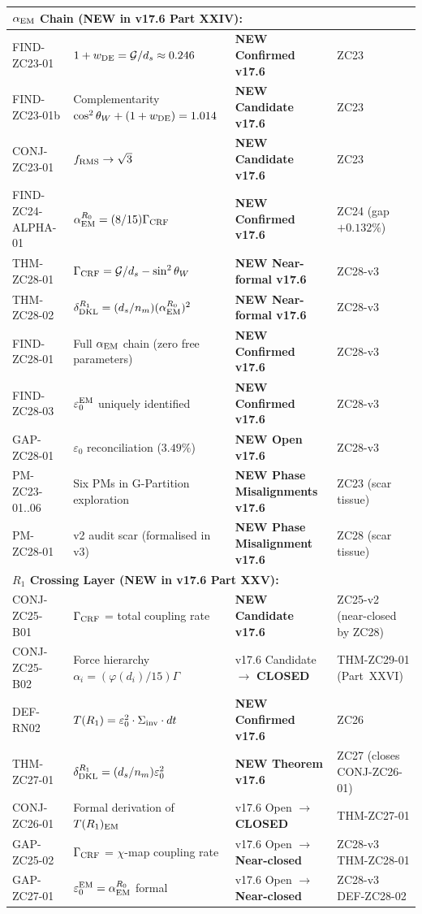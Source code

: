 \documentclass[12pt, a4paper]{article}
\begin{document}
\begin{keybox}[title={Master Z-Programme Status Table v17.6 (Canonical, Post-v17.6 Closures)}]
{\begin{longtable}{p{2.8cm} p{6.5cm} p{1.8cm} p{3.4cm}}
\midrule
\multicolumn{4}{l}{\textbf{$\alpha_{\rm EM}$ Chain (NEW in v17.6 Part XXIV):}} \\
\midrule
FIND-ZC23-01 & $1 + w_{\rm DE} = \mathcal{G}/d_s \approx 0.246$
   & \textbf{NEW Confirmed v17.6} & ZC23 \\
FIND-ZC23-01b & Complementarity $\cos^2\theta_W + (1+w_{\rm DE}) = 1.014$
   & \textbf{NEW Candidate v17.6} & ZC23 \\
CONJ-ZC23-01 & $f_{\rm RMS} \to \sqrt{3}$
   & \textbf{NEW Candidate v17.6} & ZC23 \\
FIND-ZC24-ALPHA-01 & $\alpha_{\rm EM}^{R_0} = (8/15)\Gamma_{\rm CRF}$
   & \textbf{NEW Confirmed v17.6} & ZC24 (gap $+0.132\%$) \\
THM-ZC28-01 & $\Gamma_{\rm CRF} = \mathcal{G}/d_s - \sin^2\theta_W$
   & \textbf{NEW Near-formal v17.6} & ZC28-v3 \\
THM-ZC28-02 & $\delta_{\rm DKL}^{R_1} = (d_s/n_m)(\alpha_{\rm EM}^{R_0})^2$
   & \textbf{NEW Near-formal v17.6} & ZC28-v3 \\
FIND-ZC28-01 & Full $\alpha_{\rm EM}$ chain (zero free parameters)
   & \textbf{NEW Confirmed v17.6} & ZC28-v3 \\
FIND-ZC28-03 & $\varepsilon_0^{\rm EM}$ uniquely identified
   & \textbf{NEW Confirmed v17.6} & ZC28-v3 \\
GAP-ZC28-01 & $\varepsilon_0$ reconciliation ($3.49\%$)
   & \textbf{NEW Open v17.6} & ZC28-v3 \\
PM-ZC23-01..06 & Six PMs in G-Partition exploration
   & \textbf{NEW Phase Misalignments v17.6} & ZC23 (scar tissue) \\
PM-ZC28-01 & v2 audit scar (formalised in v3)
   & \textbf{NEW Phase Misalignment v17.6} & ZC28 (scar tissue) \\

\midrule
\multicolumn{4}{l}{\textbf{$R_1$ Crossing Layer (NEW in v17.6 Part XXV):}} \\
\midrule
CONJ-ZC25-B01 & $\Gamma_{\rm CRF}$ = total coupling rate
   & \textbf{NEW Candidate v17.6} & ZC25-v2 (near-closed by ZC28) \\
CONJ-ZC25-B02 & Force hierarchy $\alpha_i = (\varphi(d_i)/15)\Gamma$
   & v17.6 Candidate $\to$ \textbf{CLOSED} & THM-ZC29-01 (Part~XXVI) \\
DEF-RN02 & $T(R_1) = \varepsilon_0^2 \cdot \Sigma_{\rm inv} \cdot dt$
   & \textbf{NEW Confirmed v17.6} & ZC26 \\
THM-ZC27-01 & $\delta_{\rm DKL}^{R_1} = (d_s/n_m)\varepsilon_0^2$
   & \textbf{NEW Theorem v17.6} & ZC27 (closes CONJ-ZC26-01) \\
CONJ-ZC26-01 & Formal derivation of $T(R_1)_{\rm EM}$
   & v17.6 Open $\to$ \textbf{CLOSED} & THM-ZC27-01 \\
GAP-ZC25-02 & $\Gamma_{\rm CRF}$ = $\chi$-map coupling rate
   & v17.6 Open $\to$ \textbf{Near-closed} & ZC28-v3 THM-ZC28-01 \\
GAP-ZC27-01 & $\varepsilon_0^{\rm EM} = \alpha_{\rm EM}^{R_0}$ formal
   & v17.6 Open $\to$ \textbf{Near-closed} & ZC28-v3 DEF-ZC28-02 \\


\end{longtable}}
\end{keybox}
\end{document}
